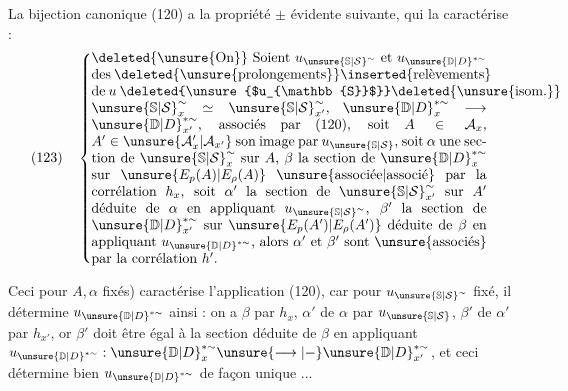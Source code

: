  La bijection canonique (120) a la propriété
$\pm$ évidente suivante, qui la caractérise :
\[
(123)\quad\left\{\vcenter{\hbox{\begin{minipage}{0.82\linewidth}
\deleted{\unsure{On}} Soient $u_{\unsure{\mathbb{S}|\mathcal{S}}^{\sim}}$ et
$u_{\unsure{\mathbb{D}|D}^{*\sim}}$ des
\deleted{\unsure{prolongements}}\inserted{relèvements} de $u$
\deleted{\unsure{$u_{\mathbb{S}}$}}\deleted{\unsure{isom.}}
$\unsure{\mathbb{S}|\mathcal{S}}_x^{\sim}\simeq\unsure{\mathbb{S}|\mathcal{S}}_{x'}^{\sim}$,
$\unsure{\mathbb{D}|D}_x^{*\sim}\longrightarrow\unsure{\mathbb{D}|D}_{x'}^{*\sim}$,
associés par (120), soit $A\in\mathcal{A}_x$,
$A'\in\unsure{\mathcal{A}'_x|\mathcal{A}_{x'}}$ son image par
$u_{\unsure{\mathbb{S}|\mathcal{S}}}$, soit $\alpha$ une section de $\unsure{\mathbb{S}|\mathcal{S}}_x^{\sim}$ sur $A$,
$\beta$ la section de $\unsure{\mathbb{D}|D}_x^{*\sim}$ sur
$\unsure{E_p(A)|E_\rho(A)}$ \unsure{associée|associé} par la corrélation
$h_x$, soit $\alpha'$ la section de $\unsure{\mathbb{S}|\mathcal{S}}_{x'}^{\sim}$ sur $A'$
déduite de $\alpha$ en appliquant $u_{\unsure{\mathbb{S}|\mathcal{S}}^{\sim}}$,
$\beta'$ la section de $\unsure{\mathbb{D}|D}_{x'}^{*\sim}$ sur
$\unsure{E_p(A')|E_\rho(A')}$ déduite de $\beta$ en appliquant
$u_{\unsure{\mathbb{D}|D}^{*\sim}}$, alors $\alpha'$ et $\beta'$ sont
\unsure{associés} par la corrélation $h'$.
\end{minipage}}}\right.
\]



Ceci  \unsure{(}pour $A,\alpha$ fixés)
caractérise l'application  (120), car pour
$u_{\unsure{\mathbb{S}|\mathcal{S}}^{\sim}}$ fixé, il détermine $u_{\unsure{\mathbb{D}|D}^{*\sim}}$ ainsi :
on a $\beta$ par $h_x$, $\alpha'$  de $\alpha$ par
$u_{\unsure{\mathbb{S}|\mathcal{S}}}$, $\beta'$  de $\alpha'$ par $h_{x'}$,
or $\beta'$ doit être égal à la section déduite de $\beta$ en appliquant
$u_{\unsure{\mathbb{D}|D}^{*\sim}}:\unsure{\mathbb{D}|D}_x^{*\sim}
\unsure{\longrightarrow|-}\unsure{\mathbb{D}|D}_{x'}^{*\sim}$,
et ceci détermine bien $u_{\unsure{\mathbb{D}|D}^{*\sim}}$ de façon unique ...

